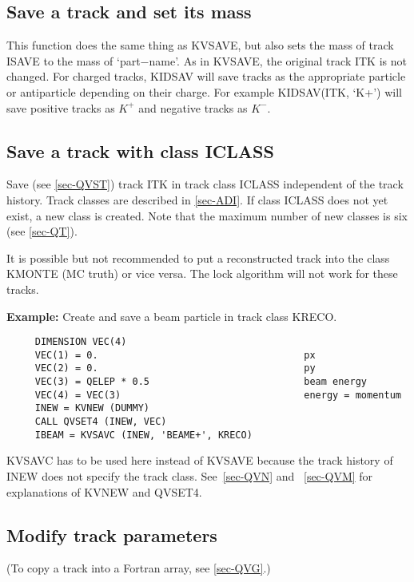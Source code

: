 \subsection{\label{sec-QVSTID}Save a track and set its mass}
\par
This function does the same thing as KVSAVE, but also sets the mass
of
track ISAVE to the mass of `part$-$name'. As in KVSAVE, the original
track ITK is not changed.  For charged tracks, KIDSAV will save tracks
as the appropriate particle or antiparticle depending on their charge.
For example  KIDSAV(ITK, `K+') will save positive tracks as $K^+$ and
negative
tracks as $K^-$.
\par
\subsection{\label{sec-QVSC}Save a track with class ICLASS}
\par
Save (see \ref{sec-QVST})
track ITK in track class ICLASS independent of the
track history. Track classes are described in
\ref{sec-ADI}. If class ICLASS does
not yet exist, a new class is created. Note that the maximum number
of
new classes is six (see \ref{sec-QT}).
\par
It is possible but not recommended to put a reconstructed track into
the class KMONTE (MC truth) or vice versa. The lock algorithm will
not work for these tracks.
\par
{\bf Example: }Create and save a beam particle in track class KRECO.
\begin{verbatim}
     DIMENSION VEC(4)
     VEC(1) = 0.                                    px
     VEC(2) = 0.                                    py
     VEC(3) = QELEP * 0.5                           beam energy
     VEC(4) = VEC(3)                                energy = momentum
     INEW = KVNEW (DUMMY)
     CALL QVSET4 (INEW, VEC)
     IBEAM = KVSAVC (INEW, 'BEAME+', KRECO)
\end{verbatim}
KVSAVC has to be used here instead of KVSAVE because the track history
of INEW does not specify the track class. See~\ref{sec-QVN} and ~\ref{sec-QVM}
for explanations of KVNEW and QVSET4.
\par
\subsection{\label{sec-QVM}Modify track parameters}
\par
(To copy a track into a Fortran array, see
\ref{sec-QVG}.)
 
